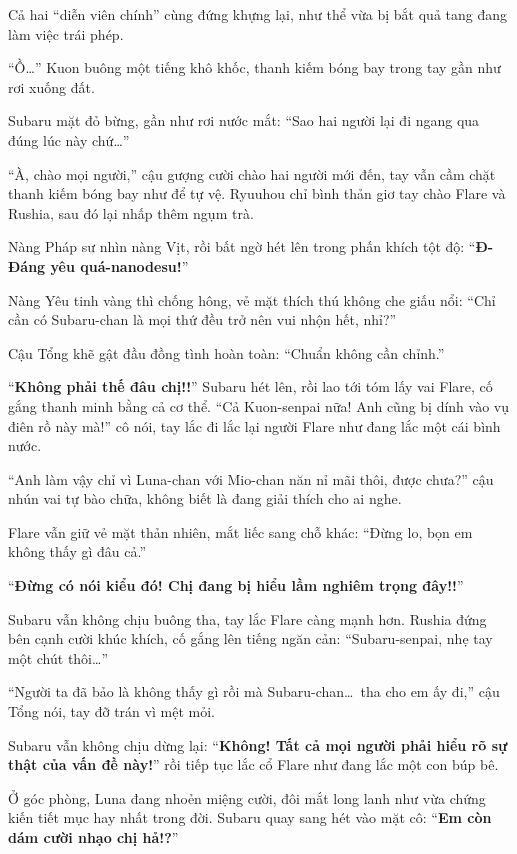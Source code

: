 \documentclass[../main.tex]{subfiles}
\begin{document}

Cả hai ``diễn viên chính'' cùng đứng khựng lại, như thể vừa bị bắt quả tang đang làm việc trái phép.

``Ồ\dots'' Kuon buông một tiếng khô khốc, thanh kiếm bóng bay trong tay gần như rơi xuống đất.

Subaru mặt đỏ bừng, gần như rơi nước mắt: ``Sao hai người lại đi ngang qua đúng lúc này chứ\dots''

``À, chào mọi người,'' cậu gượng cười chào hai người mới đến, tay vẫn cầm chặt thanh kiếm bóng bay như để tự vệ. Ryuuhou chỉ bình thản giơ tay chào Flare và Rushia, sau đó lại nhấp thêm ngụm trà.

Nàng Pháp sư nhìn nàng Vịt, rồi bất ngờ hét lên trong phấn khích tột độ: ``\textbf{Đ-Đáng yêu quá-nanodesu!}''

Nàng Yêu tinh vàng thì chống hông, vẻ mặt thích thú không che giấu nổi: ``Chỉ cần có Subaru-chan là mọi thứ đều trở nên vui nhộn hết, nhỉ?''

Cậu Tổng khẽ gật đầu đồng tình hoàn toàn: ``Chuẩn không cần chỉnh.''

``\textbf{Không phải thế đâu chị!!}'' Subaru hét lên, rồi lao tới tóm lấy vai Flare, cố gắng thanh minh bằng cả cơ thể. ``Cả Kuon-senpai nữa! Anh cũng bị dính vào vụ điên rồ này mà!'' cô nói, tay lắc đi lắc lại người Flare như đang lắc một cái bình nước.

``Anh làm vậy chỉ vì Luna-chan với Mio-chan năn nỉ mãi thôi, được chưa?'' cậu nhún vai tự bào chữa, không biết là đang giải thích cho ai nghe.

Flare vẫn giữ vẻ mặt thản nhiên, mắt liếc sang chỗ khác: ``Đừng lo, bọn em không thấy gì đâu cả.''

``\textbf{Đừng có nói kiểu đó! Chị đang bị hiểu lầm nghiêm trọng đây!!}''

Subaru vẫn không chịu buông tha, tay lắc Flare càng mạnh hơn. Rushia đứng bên cạnh cười khúc khích, cố gắng lên tiếng ngăn cản: ``Subaru-senpai, nhẹ tay một chút thôi\dots''

``Người ta đã bảo là không thấy gì rồi mà Subaru-chan\dots\ tha cho em ấy đi,'' cậu Tổng nói, tay đỡ trán vì mệt mỏi.

Subaru vẫn không chịu dừng lại: ``\textbf{Không! Tất cả mọi người phải hiểu rõ sự thật của vấn đề này!}'' rồi tiếp tục lắc cổ Flare như đang lắc một con búp bê.

Ở góc phòng, Luna đang nhoẻn miệng cười, đôi mắt long lanh như vừa chứng kiến tiết mục hay nhất trong đời. Subaru quay sang hét vào mặt cô: ``\textbf{Em còn dám cười nhạo chị hả!?}''
\end{document}
